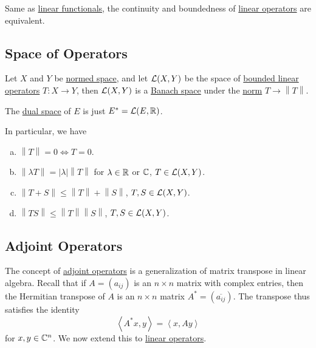 \begin{remark}
	Same as \hyperref[def:linear-functional]{linear functionals}, the continuity and boundedness of \hyperref[def:linear-op]{linear operators} are equivalent.
\end{remark}

\subsection{Space of Operators}
Let \(X\) and \(Y\) be \hyperref[def:normed-vector-space]{normed space}, and let \(\mathcal{\MakeUppercase{l}} (X, Y) \) be the space of \hyperref[def:bounded-linear-op]{bounded linear operators} \(T\colon X\to Y\), then \(\mathcal{\MakeUppercase{l}} (X, Y)\) is a \hyperref[def:Banach-space]{Banach space} under the \hyperref[def:norm]{norm} \(T\to \left\lVert T\right\rVert \).

\begin{eg}
	The \hyperref[def:dual-space]{dual space} of \(E\) is just \(E^{\ast} = \mathcal{\MakeUppercase{l}} (E, \mathbb{\MakeUppercase{r}} )\).
\end{eg}

\begin{remark}
	In particular, we have
	\begin{enumerate}[(a)]
		\item \(\left\lVert T\right\rVert = 0 \iff T = 0\).
		\item \(\left\lVert \lambda T\right\rVert = \left\vert \lambda  \right\vert \left\lVert T\right\rVert  \) for \(\lambda \in \mathbb{\MakeUppercase{r}} \) or \(\mathbb{\MakeUppercase{c}} \), \(T\in \mathcal{\MakeUppercase{l}} (X, Y)\).
		\item \(\left\lVert T + S\right\rVert \leq \left\lVert T\right\rVert + \left\lVert S\right\rVert \), \(T, S \in \mathcal{\MakeUppercase{l}} (X, Y)\).
		\item \(\left\lVert TS\right\rVert \leq \left\lVert T\right\rVert \left\lVert S\right\rVert \), \(T, S\in \mathcal{\MakeUppercase{l}} (X, Y)\).
	\end{enumerate}
\end{remark}

\subsection{Adjoint Operators}
The concept of \hyperref[def:adjoint-op]{adjoint operators} is a generalization of matrix transpose in linear algebra. Recall that if \(A = (a_{ij} )\) is an \(n\times n\) matrix with complex entries, then the Hermitian transpose of \(A\) is an \(n\times n\) matrix \(A^{\ast} = (\overline{a_{ij}})\). The transpose thus satisfies the identity
\[
	\left\langle A^{\ast} x, y \right\rangle = \left\langle x, Ay \right\rangle
\]
for \(x, y\in \mathbb{\MakeUppercase{c}} ^n\). We now extend this to \hyperref[def:linear-op]{linear operators}.

